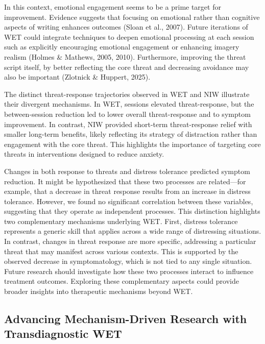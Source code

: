 \documentclass[
  man,floatsintext]{apa7}
\begin{document}
In this context, emotional engagement seems to be a prime target for improvement.
Evidence suggests that focusing on emotional rather than cognitive aspects of writing enhances outcomes (Sloan et al., 2007).
Future iterations of WET could integrate techniques to deepen emotional processing at each session such as explicitly encouraging emotional engagement or enhancing imagery realism (Holmes \& Mathews, 2005, 2010).
Furthermore, improving the threat script itself, by better reflecting the core threat and decreasing avoidance may also be important (Zlotnick \& Huppert, 2025).

The distinct threat-response trajectories observed in WET and NIW illustrate their divergent mechanisms.
In WET, sessions elevated threat-response, but the between-session reduction led to lower overall threat-response and to symptom improvement.
In contrast, NIW provided short-term threat-response relief with smaller long-term benefits, likely reflecting its strategy of distraction rather than engagement with the core threat.
This highlights the importance of targeting core threats in interventions designed to reduce anxiety.

Changes in both response to threats and distress tolerance predicted symptom reduction.
It might be hypothesized that these two processes are related---for example, that a decrease in threat response results from an increase in distress tolerance.
However, we found no significant correlation between these variables, suggesting that they operate as independent processes.
This distinction highlights two complementary mechanisms underlying WET.
First, distress tolerance represents a generic skill that applies across a wide range of distressing situations.
In contrast, changes in threat response are more specific, addressing a particular threat that may manifest across various contexts.
This is supported by the observed decrease in symptomatology, which is not tied to any single situation.
Future research should investigate how these two processes interact to influence treatment outcomes.
Exploring these complementary aspects could provide broader insights into therapeutic mechanisms beyond WET.

\subsection{Advancing Mechanism-Driven Research with Transdiagnostic WET}\label{advancing-mechanism-driven-research-with-transdiagnostic-wet}
\end{document}
